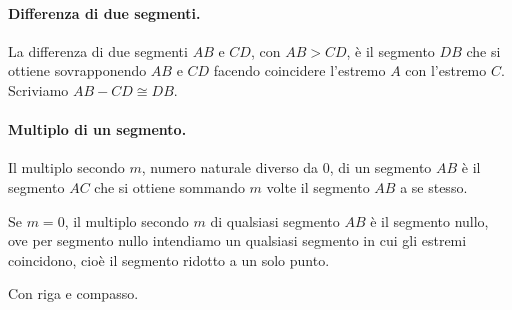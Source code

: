 \paragraph{Differenza di due segmenti.} La differenza di due segmenti 
\(AB\) e \(CD\), con \(AB>CD\), è il segmento \(DB\) che si ottiene 
sovrapponendo \(AB\) e \(CD\) facendo coincidere l'estremo \(A\) con 
l'estremo \(C\). Scriviamo \(AB-CD \cong DB\).


\begin{inaccessibleblock}
\begin{center}\end{center}
\end{inaccessibleblock}

\paragraph{Multiplo di un segmento.} Il multiplo secondo \(m\), numero 
naturale diverso da 0, di un segmento \(AB\) è il segmento \(AC\) che si 
ottiene sommando \(m\) volte il segmento \(AB\) a se stesso.

\begin{inaccessibleblock}
\begin{center}\end{center}
\end{inaccessibleblock}

Se \(m=0\), il multiplo secondo \(m\) di qualsiasi segmento \(AB\) è il 
segmento nullo, ove per segmento nullo intendiamo un qualsiasi 
segmento in cui gli estremi coincidono, cioè il segmento ridotto a un 
solo punto.

Con riga e compasso.

